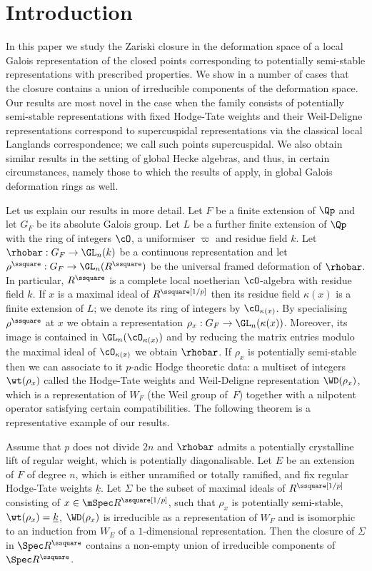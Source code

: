 \section{Introduction} In this paper we study the Zariski closure in the deformation space
of a local Galois representation of the closed points corresponding to potentially semi-stable representations with prescribed properties. We show in a number of cases that the closure contains a union of irreducible components of the deformation space. Our results are most novel in the case when the family consists of potentially semi-stable representations with fixed Hodge-Tate weights and their Weil-Deligne representations correspond to supercuspidal representations via the classical local Langlands correspondence; we call such points supercuspidal. We also obtain similar results in the setting of global Hecke algebras, and thus,
in certain circumstances, namely those to which the results of \cite{HMS} apply, in global
Galois deformation rings as well.

Let us explain our results in more detail. Let $F$ be a finite extension of $\Qp$ and let $G_F$ be its absolute Galois group. Let $L$ be a
further finite extension of $\Qp$ with the ring of integers $\cO$, a uniformiser $\varpi$ and residue field $k$. Let $\rhobar: G_F \to \GL_n(k)$ be a continuous representation
and let $\rho^\ssquare: G_F\to \GL_n(R^\ssquare)$ be the universal framed
deformation of $\rhobar$. In particular, $R^\ssquare$ is a complete local noetherian
$\cO$-algebra with residue field $k$. If $x$ is a maximal ideal of $R^\ssquare [1/p]$ then
its residue field $\kappa(x)$ is a finite extension of $L$; we denote its ring of integers by $\cO_{\kappa(x)}$. By specialising $\rho^\ssquare$ at
$x$ we obtain a representation $\rho_x: G_F\to \GL_n(\kappa(x))$. Moreover,
its image is contained in $\GL_n(\cO_{\kappa(x)})$ and by reducing the matrix entries modulo
the maximal ideal of $\cO_{\kappa(x)}$ we obtain $\rhobar$. If $\rho_x$ is potentially semi-stable then we can associate to it $p$-adic Hodge theoretic data: a multiset of integers
$\wt(\rho_x)$ called the Hodge-Tate weights and Weil-Deligne representation
$\WD(\rho_x)$, which is a representation of $W_F$ (the Weil group of~$F$)
together with a nilpotent operator satisfying certain compatibilities. The following theorem is a representative example of our results.

\begin{thm}\label{A} Assume that $p$ does not divide $2n$ and $\rhobar$ admits a potentially crystalline lift of regular weight, which is
potentially diagonalisable. Let $E$ be an extension of $F$ of degree $n$, which is either unramified or totally ramified, and fix regular Hodge-Tate weights $\underline{k}$.
Let $\Sigma$ be the subset of maximal ideals of $R^\ssquare [1/p]$ consisting of $x\in \mSpec R^\ssquare [1/p]$, such that $\rho_x$ is potentially semi-stable, $\wt(\rho_x)= \underline{k}$,
$\WD(\rho_x)$ is irreducible as a representation of $W_F$ and is isomorphic to an induction from $W_E$ of a $1$-dimensional representation. Then the closure of $\Sigma$ in $\Spec R^\ssquare$ contains a non-empty
union of irreducible components of $\Spec R^\ssquare$.
\end{thm}

